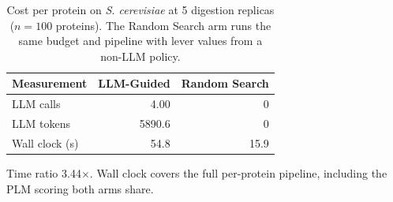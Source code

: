 \begin{table}[!tb]
  \centering
  \caption{Cost per protein on \textnormal{\textnormal{\textit{S. cerevisiae}}} at 5 digestion replicas ($n=100$ proteins). The Random Search arm runs the same budget and pipeline with lever values from a non-LLM policy.}
  \label{tab:cost_yeast_r5}
  \begin{tabular}{lrr}
    \toprule
    Measurement & LLM-Guided & Random Search \\
    \midrule
    LLM calls & 4.00 & 0 \\
    LLM tokens & 5890.6 & 0 \\
    Wall clock (s) & 54.8 & 15.9 \\
    \bottomrule
  \end{tabular}
  \par\smallskip\footnotesize{Time ratio 3.44$\times$. Wall clock covers the full per-protein pipeline, including the PLM scoring both arms share.}
\end{table}

